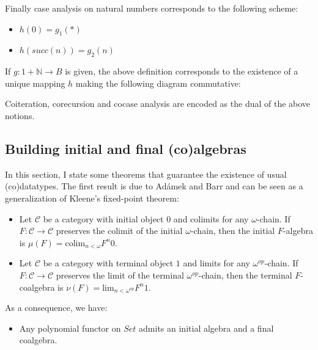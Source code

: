 \documentclass[notitlepage]{article}
\begin{document}
Finally case analysis on natural numbers corresponds to the following scheme:

\begin{itemize}
	\item $h(0) = g_1(*)$
	\item $h(succ(n)) = g_2(n)$
\end{itemize}

If $g: 1 + \mathbb{N} \to B$ is given, the above definition corresponds to the existence of a unique mapping $h$ making the following diagram commutative:


Coiteration, corecursion and cocase analysis are encoded as the dual of the above notions.

\subsection{Building initial and final (co)algebras}

In this section, I state some theorems that guarantee the existence of usual (co)datatypes. The first result is due to Adámek and Barr and can be seen as a generalization of Kleene's fixed-point theorem:

\begin{itemize}
	\item Let $\mathcal{C}$ be a category with initial object $0$ and colimits for any $\omega$-chain. If $F: \mathcal{C} \to \mathcal{C}$ preserves the colimit of the initial $\omega$-chain, then the initial $F$-algebra is $\mu(F) = \text{colim}_{n < \omega} F^n 0$.
	\item Let $\mathcal{C}$ be a category with terminal object $1$ and limits for any $\omega^{op}$-chain. If $F: \mathcal{C} \to \mathcal{C}$ preserves the limit of the terminal $\omega^{op}$-chain, then the terminal $F$-coalgebra is $\nu(F) = \text{lim}_{n < \omega^{op}} F^n 1$.
\end{itemize}

As a consequence, we have:

\begin{itemize}
	\item Any polynomial functor on $Set$ admits an initial algebra and a final coalgebra.
\end{itemize}
\end{document}
